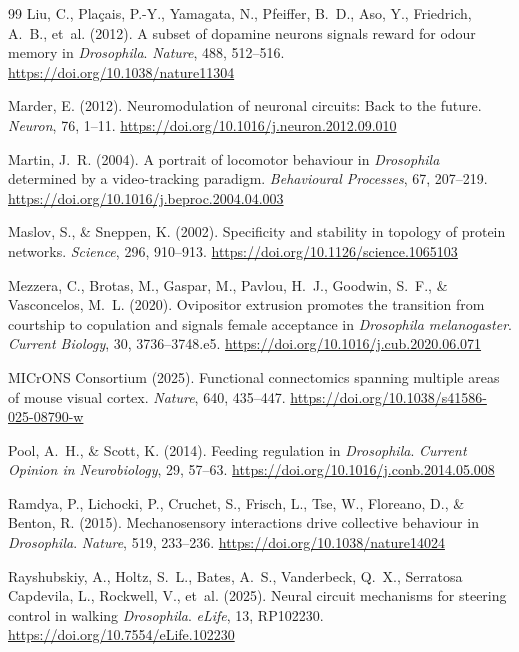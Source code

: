 \documentclass[11pt,a4paper]{article}
\begin{document}
\begin{thebibliography}{99}
Liu, C., Pla\c{c}ais, P.-Y., Yamagata, N., Pfeiffer, B.~D., Aso, Y., Friedrich, A.~B., et~al. (2012). A subset of dopamine neurons signals reward for odour memory in \emph{Drosophila}. \emph{Nature}, 488, 512--516. \url{https://doi.org/10.1038/nature11304}

Marder, E. (2012). Neuromodulation of neuronal circuits: Back to the future. \emph{Neuron}, 76, 1--11. \url{https://doi.org/10.1016/j.neuron.2012.09.010}

Martin, J.~R. (2004). A portrait of locomotor behaviour in \emph{Drosophila} determined by a video-tracking paradigm. \emph{Behavioural Processes}, 67, 207--219. \url{https://doi.org/10.1016/j.beproc.2004.04.003}

Maslov, S., \& Sneppen, K. (2002). Specificity and stability in topology of protein networks. \emph{Science}, 296, 910--913. \url{https://doi.org/10.1126/science.1065103}

Mezzera, C., Brotas, M., Gaspar, M., Pavlou, H.~J., Goodwin, S.~F., \& Vasconcelos, M.~L. (2020). Ovipositor extrusion promotes the transition from courtship to copulation and signals female acceptance in \emph{Drosophila melanogaster}. \emph{Current Biology}, 30, 3736--3748.e5. \url{https://doi.org/10.1016/j.cub.2020.06.071}

MICrONS Consortium (2025). Functional connectomics spanning multiple areas of mouse visual cortex. \emph{Nature}, 640, 435--447. \url{https://doi.org/10.1038/s41586-025-08790-w}

Pool, A.~H., \& Scott, K. (2014). Feeding regulation in \emph{Drosophila}. \emph{Current Opinion in Neurobiology}, 29, 57--63. \url{https://doi.org/10.1016/j.conb.2014.05.008}

Ramdya, P., Lichocki, P., Cruchet, S., Frisch, L., Tse, W., Floreano, D., \& Benton, R. (2015). Mechanosensory interactions drive collective behaviour in \emph{Drosophila}. \emph{Nature}, 519, 233--236. \url{https://doi.org/10.1038/nature14024}

Rayshubskiy, A., Holtz, S.~L., Bates, A.~S., Vanderbeck, Q.~X., Serratosa Capdevila, L., Rockwell, V., et~al. (2025). Neural circuit mechanisms for steering control in walking \emph{Drosophila}. \emph{eLife}, 13, RP102230. \url{https://doi.org/10.7554/eLife.102230}


\end{thebibliography}
\end{document}

